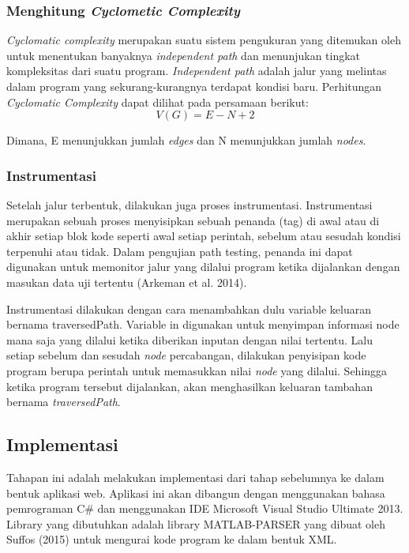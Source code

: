 \subsubsection*{Menghitung \textit{Cyclometic Complexity}}

\textit{Cyclomatic complexity} merupakan suatu sistem pengukuran yang ditemukan oleh \citeauthor{MCCABE} untuk menentukan banyaknya \textit{independent path} dan menunjukan tingkat kompleksitas dari suatu program. \textit{Independent path} adalah jalur yang melintas dalam program yang sekurang-kurangnya terdapat kondisi baru. Perhitungan \textit{Cyclomatic Complexity} dapat dilihat pada persamaan berikut:
\[V(G)=E-N+2\]

Dimana, E menunjukkan jumlah \textit{edges} dan N menunjukkan jumlah \textit{nodes}.

\subsubsection*{Instrumentasi}
Setelah jalur terbentuk, dilakukan juga proses instrumentasi. Instrumentasi merupakan sebuah proses menyisipkan sebuah penanda (tag) di awal atau di akhir setiap blok kode seperti awal setiap perintah, sebelum atau sesudah kondisi terpenuhi atau tidak. Dalam pengujian path testing, penanda ini dapat digunakan untuk memonitor jalur yang dilalui program ketika dijalankan dengan masukan data uji tertentu (Arkeman et al. 2014). 

Instrumentasi dilakukan dengan cara menambahkan dulu variable keluaran bernama traversedPath. Variable in digunakan untuk menyimpan informasi node mana saja yang dilalui ketika diberikan inputan dengan nilai tertentu. Lalu setiap sebelum dan sesudah \textit{node} percabangan, dilakukan penyisipan kode program berupa perintah untuk memasukkan nilai \textit{node} yang dilalui. Sehingga ketika program tersebut dijalankan, akan menghasilkan keluaran tambahan bernama \textit{traversedPath}. 

\subsection*{Implementasi}

Tahapan ini adalah melakukan implementasi dari tahap sebelumnya ke dalam bentuk aplikasi web. Aplikasi ini akan dibangun dengan menggunakan bahasa pemrograman C# dan menggunakan IDE Microsoft Visual Studio Ultimate 2013. Library yang dibutuhkan adalah library MATLAB-PARSER yang dibuat oleh Suffos (2015) untuk mengurai kode program ke dalam bentuk XML.
 
